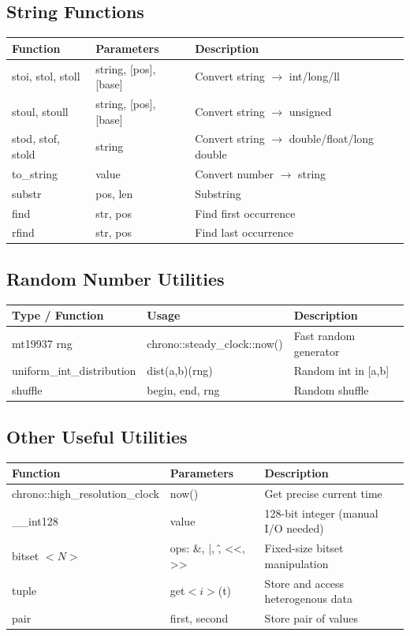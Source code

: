 \documentclass[10pt,letterpaper,landscape,twocolumn]{article}
\begin{document}
\subsection*{String Functions}
\begin{tabularx}{\linewidth}{|l|l|X|}
    \hline
    \textbf{Function} & \textbf{Parameters} & \textbf{Description} \\
    \hline
    stoi, stol, stoll & string, [pos], [base] & Convert string $\to$ int/long/ll \\
    \hline
    stoul, stoull & string, [pos], [base] & Convert string $\to$ unsigned \\
    \hline
    stod, stof, stold & string & Convert string $\to$ double/float/long double \\
    \hline
    to\_string & value & Convert number $\to$ string \\
    \hline
    substr & pos, len & Substring \\
    \hline
    find & str, pos & Find first occurrence \\
    \hline
    rfind & str, pos & Find last occurrence \\
    \hline
\end{tabularx}

\subsection*{Random Number Utilities}
\begin{tabularx}{\linewidth}{|l|l|X|}
    \hline
    \textbf{Type / Function} & \textbf{Usage} & \textbf{Description} \\
    \hline
    mt19937 rng & chrono::steady\_clock::now() & Fast random generator \\
    \hline
    uniform\_int\_distribution & dist(a,b)(rng) & Random int in [a,b] \\
    \hline
    shuffle & begin, end, rng & Random shuffle \\
    \hline
\end{tabularx}

\subsection*{Other Useful Utilities}
\begin{tabularx}{\linewidth}{|l|l|X|}
    \hline
    \textbf{Function} & \textbf{Parameters} & \textbf{Description} \\
    \hline
    chrono::high\_resolution\_clock & now() & Get precise current time \\
    \hline
    \_\_int128 & value & 128-bit integer (manual I/O needed) \\
    \hline
    bitset $<N>$ & ops: \&, |, \^, <<, >> & Fixed-size bitset manipulation \\
    \hline
    tuple & get$<i>$(t) & Store and access heterogenous data \\
    \hline
    pair & first, second & Store pair of values \\
    \hline
\end{tabularx}
\end{document}
